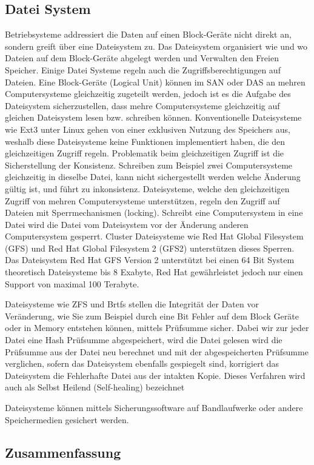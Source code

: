 \subsection{Datei System}
Betriebsysteme addressiert die Daten auf einen Block-Geräte nicht direkt an, sondern greift über eine Dateisystem zu. Das Dateisystem organisiert wie und wo Dateien auf dem Block-Geräte abgelegt werden und Verwalten den Freien Speicher. Einige Datei Systeme regeln auch die Zugriffsberechtigungen auf Dateien. Eine Block-Geräte (Logical Unit) können im SAN oder DAS an mehren Computersysteme gleichzeitig zugeteilt werden, jedoch ist es die Aufgabe des Dateisystem sicherzustellen, dass mehre Computersysteme gleichzeitig auf gleichen Dateisystem lesen bzw. schreiben können. Konventionelle Dateisysteme wie Ext3 unter Linux gehen von einer exklusiven Nutzung des Speichers aus, weshalb diese Dateisysteme keine Funktionen implementiert haben, die den gleichzeitigen Zugriff regeln. Problematik beim gleichzeitigen Zugriff ist die Sicherstellung der Konsistenz. Schreiben zum Beispiel zwei Computersysteme gleichzeitig in dieselbe Datei, kann nicht sichergestellt werden welche Änderung gültig ist, und führt zu inkonsistenz. Dateisysteme, welche den gleichzeitigen Zugriff von mehren Computersysteme unterstützen, regeln den Zugriff auf Dateien mit Sperrmechanismen (locking). Schreibt eine Computersystem in eine Datei wird die Datei vom Dateisystem vor der Änderung anderen Computersystem gesperrt. Cluster Dateisysteme wie Red Hat Global Filesystem (GFS) und Red Hat Global Filesystem 2 (GFS2) unterstützen dieses Sperren. Das Dateisystem Red Hat GFS Version 2 unterstützt bei einen 64 Bit System theoretisch Dateisysteme bis 8 Exabyte, Red Hat gewährleistet jedoch nur einen Support von maximal 100 Terabyte.\cite{Levine2011}

Dateisysteme wie ZFS und Brtfs stellen die Integrität der Daten vor Veränderung, wie Sie zum Beispiel durch eine Bit Fehler auf dem Block Geräte oder in Memory entstehen können, mittels Prüfsumme sicher. Dabei wir zur jeder Datei eine Hash Prüfsumme abgespeichert, wird die Datei gelesen wird die Prüfsumme aus der Datei neu berechnet und mit der abgespeicherten Prüfsumme verglichen, sofern das Dateisystem ebenfalls gespiegelt sind, korrigiert das Dateisystem die Fehlerhafte Datei aus der intakten Kopie. Dieses Verfahren wird auch als Selbst Heilend (Self-healing) bezeichnet \cite{Bonwick2005}\cite{Oracle}

Dateisysteme können mittels Sicherungssoftware auf Bandlaufwerke oder andere Speichermedien gesichert werden.


\subsection{Zusammenfassung}



